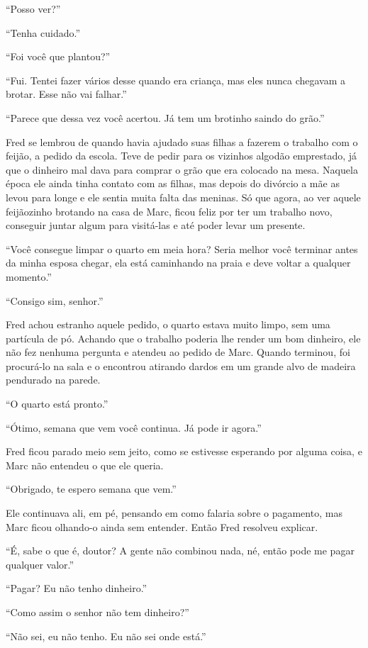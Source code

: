 ``Posso ver?''

``Tenha cuidado.''

``Foi você que plantou?''

``Fui. Tentei fazer vários desse quando era criança, mas eles nunca
chegavam a brotar. Esse não vai falhar.''

``Parece que dessa vez você acertou. Já tem um brotinho saindo do
grão.''

Fred se lembrou de quando havia ajudado suas filhas a fazerem o trabalho
com o feijão, a pedido da escola. Teve de pedir para os vizinhos algodão
emprestado, já que o dinheiro mal dava para comprar o grão que era
colocado na mesa. Naquela época ele ainda tinha contato com as filhas,
mas depois do divórcio a mãe as levou para longe e ele sentia muita
falta das meninas. Só que agora, ao ver aquele feijãozinho brotando na
casa de Marc, ficou feliz por ter um trabalho novo, conseguir juntar
algum para visitá-las e até poder levar um presente.

``Você consegue limpar o quarto em meia hora? Seria melhor você terminar
antes da minha esposa chegar, ela está caminhando na praia e deve voltar
a qualquer momento.''

``Consigo sim, senhor.''

Fred achou estranho aquele pedido, o quarto estava muito limpo, sem uma
partícula de pó. Achando que o trabalho poderia lhe render um bom
dinheiro, ele não fez nenhuma pergunta e atendeu ao pedido de Marc.
Quando terminou, foi procurá-lo na sala e o encontrou atirando dardos em
um grande alvo de madeira pendurado na parede.

``O quarto está pronto.''

``Ótimo, semana que vem você continua. Já pode ir agora.''

Fred ficou parado meio sem jeito, como se estivesse esperando por alguma
coisa, e Marc não entendeu o que ele queria.

``Obrigado, te espero semana que vem.''

Ele continuava ali, em pé, pensando em como falaria sobre o pagamento,
mas Marc ficou olhando-o ainda sem entender. Então Fred resolveu
explicar.

``É, sabe o que é, doutor? A gente não combinou nada, né, então pode me
pagar qualquer valor.''

``Pagar? Eu não tenho dinheiro.''

``Como assim o senhor não tem dinheiro?''

``Não sei, eu não tenho. Eu não sei onde está.''

